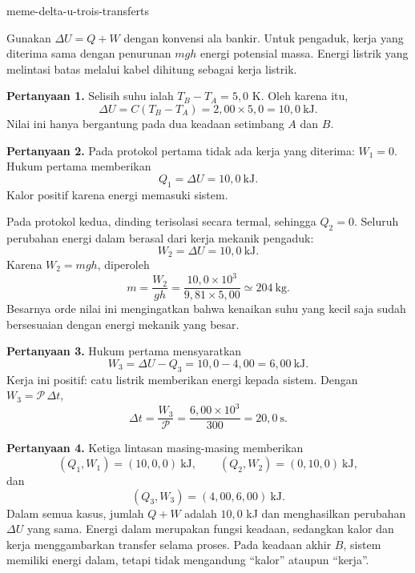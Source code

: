 \begin{exo}{meme-delta-u-trois-transferts}
\begin{indication}
Gunakan $\Delta U=Q+W$ dengan konvensi ala bankir. Untuk pengaduk, kerja yang
diterima sama dengan penurunan $mgh$ energi potensial massa. Energi listrik
yang melintasi batas melalui kabel dihitung sebagai kerja listrik.
\end{indication}

\begin{solution}
\textbf{Pertanyaan 1.} Selisih suhu ialah $T_B-T_A=5{,}0$ K. Oleh karena itu,
\[
\Delta U=C(T_B-T_A)
=2{,}00\times5{,}0
=10{,}0\ \mathrm{kJ}.
\]
Nilai ini hanya bergantung pada dua keadaan setimbang $A$ dan $B$.

\textbf{Pertanyaan 2.} Pada protokol pertama tidak ada kerja yang diterima:
$W_1=0$. Hukum pertama memberikan
\[
Q_1=\Delta U=10{,}0\ \mathrm{kJ}.
\]
Kalor positif karena energi memasuki sistem.

Pada protokol kedua, dinding terisolasi secara termal, sehingga $Q_2=0$.
Seluruh perubahan energi dalam berasal dari kerja mekanik pengaduk:
\[
W_2=\Delta U=10{,}0\ \mathrm{kJ}.
\]
Karena $W_2=mgh$, diperoleh
\[
m=\frac{W_2}{gh}
=\frac{10{,}0\times10^3}{9{,}81\times5{,}00}
\simeq 204\ \mathrm{kg}.
\]
Besarnya orde nilai ini mengingatkan bahwa kenaikan suhu yang kecil saja
sudah bersesuaian dengan energi mekanik yang besar.

\textbf{Pertanyaan 3.} Hukum pertama mensyaratkan
\[
W_3=\Delta U-Q_3=10{,}0-4{,}00=6{,}00\ \mathrm{kJ}.
\]
Kerja ini positif: catu listrik memberikan energi kepada sistem. Dengan
$W_3=\mathcal P\,\Delta t$,
\[
\Delta t=\frac{W_3}{\mathcal P}
=\frac{6{,}00\times10^3}{300}
=20{,}0\ \mathrm{s}.
\]

\textbf{Pertanyaan 4.} Ketiga lintasan masing-masing memberikan
\[
(Q_1,W_1)=(10{,}0,0)\ \mathrm{kJ},
\qquad
(Q_2,W_2)=(0,10{,}0)\ \mathrm{kJ},
\]
dan
\[
(Q_3,W_3)=(4{,}00,6{,}00)\ \mathrm{kJ}.
\]
Dalam semua kasus, jumlah $Q+W$ adalah $10{,}0$ kJ dan menghasilkan perubahan
$\Delta U$ yang sama. Energi dalam merupakan fungsi keadaan, sedangkan kalor
dan kerja menggambarkan transfer selama proses. Pada keadaan akhir $B$, sistem
memiliki energi dalam, tetapi tidak mengandung “kalor” ataupun “kerja”.
\end{solution}
\end{exo}

